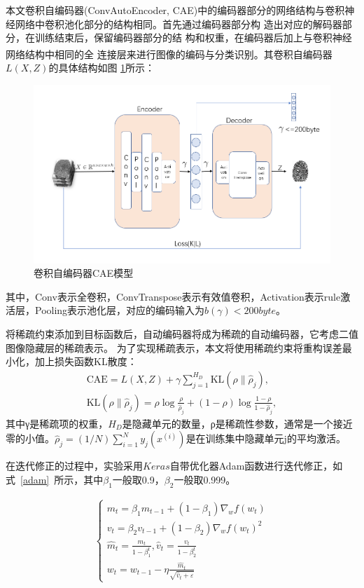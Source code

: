\documentclass{whutmod}
\newcommand{\upcite}[1]{\textsuperscript{\cite{#1}}}
\begin{document}
\begin{itemize}
			本文卷积自编码器(ConvAutoEncoder, CAE)中的编码器部分的网络结构与卷积神
			经网络中卷积池化部分的结构相同。首先通过编码器部分构
			造出对应的解码器部分，在训练结束后，保留编码器部分的结
			构和权重，在编码器后加上与卷积神经网络结构中相同的全
			连接层来进行图像的编码与分类识别\upcite{12,13}。其卷积自编码器$L(X,Z)$的具体结构如图
			\ref{labssel}所示：
					\begin{figure}[H]
				\centering
				\includegraphics[width=\textwidth]{figures/model.png}
				\caption{卷积自编码器CAE模型}\label{labssel}
			\end{figure}
		其中，Conv表示全卷积，ConvTranspose表示有效值卷积，Activation表示rule激活层，Pooling表示池化层，对应的编码输入为$b(\gamma)<200byte$。
		
	
					将稀疏约束添加到目标函数后，自动编码器将成为稀疏的自动编码器，它考虑二值图像隐藏层的稀疏表示。 为了实现稀疏表示，本文将使用稀疏约束将重构误差最小化，加上损失函数KL散度：
								\begin{gather}
					 \mathrm{CAE}=L(X, Z)+\gamma \sum_{j=1}^{H_{D}} \mathrm{KL}\left(\rho \| \hat{\rho}_{j}\right),\\
					 \mathrm{KL}\left(\rho \| \hat{\rho}_{j}\right)=\rho \log \frac{\rho}{\hat{\rho}_{j}}+(1-\rho) \log \frac{1-\rho}{1-\hat{\rho}_{j}},
								\end{gather}
					其中γ是稀疏项的权重，$H_D$是隐藏单元的数量，ρ是稀疏性参数，通常是一个接近零的小值。$\hat{\rho}_{j}=(1 / N) \sum_{i=1}^{N} y_{j}\left(x^{(i)}\right)$是在训练集中隐藏单元j的平均激活。

在迭代修正的过程中，实验采用$Keras$自带优化器Adam函数进行迭代修正，如式~\ref{adam}~所示，其中$\beta_{1}$一般取0.9，$\beta_{2}$一般取0.999。

\begin{gather*}\label{adam}
\left\{\begin{array}{l}{m_{t}=\beta_{1} m_{t-1}+\left(1-\beta_{1}\right) \nabla_{w} f\left(w_{t}\right)} \\ {v_{t}=\beta_{2} v_{t-1}+\left(1-\beta_{2}\right) \nabla_{w} f\left(w_{t}\right)^{2}} \\ {\widehat{m}_{t}=\frac{m_{t}}{1-\beta_{1}^{t}}, \hat{v}_{t}=\frac{v_{t}}{1-\beta_{2}^{t}}} \\ {w_{t}=w_{t-1}-\eta \frac{\widehat{m}_{t}}{\sqrt{\hat{v}_{t}+\varepsilon}}}\end{array}\right.
\end{gather*}


\end{itemize}
\end{document}
